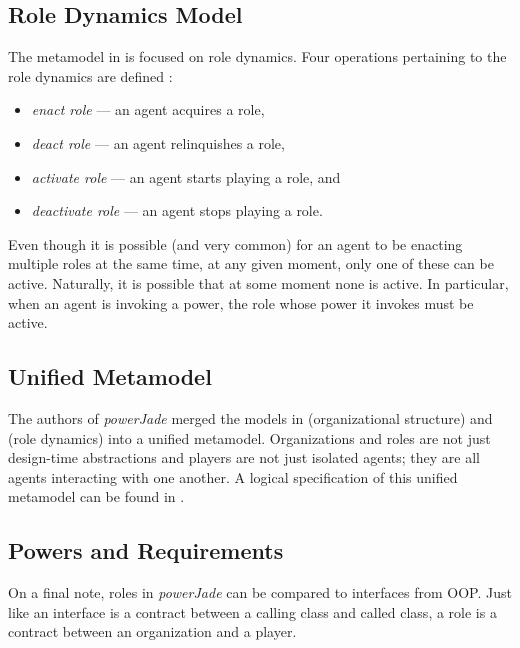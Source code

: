 \subsection*{Role Dynamics Model}

The metamodel in \cite{Dastani04} is focused on role dynamics.
Four operations pertaining to the role dynamics are defined \cite{Dastani04}:
\begin{itemize} %
	\item \textit{enact role} --- an agent acquires a role,
	\item \textit{deact role} --- an agent relinquishes a role,
	\item \textit{activate role} --- an agent starts playing a role, and
	\item \textit{deactivate role} --- an agent stops playing a role.
\end{itemize}

Even though it is possible (and very common) for an agent to be enacting multiple roles at the same time, at any given moment, only one of these can be active.
Naturally, it is possible that at some moment none is active.
In particular, when an agent is invoking a power, the role whose power it invokes must be active.

\subsection*{Unified Metamodel}

The authors of \textit{powerJade} merged the models in \cite{Boella04} (organizational structure) and \cite{Boella04} (role dynamics) into a unified metamodel.
Organizations and roles are not just design-time abstractions and players are not just isolated agents; they are all agents interacting with one another.
A logical specification of this unified metamodel can be found in \cite{Boella07}.

\subsection*{Powers and Requirements}

On a final note, roles in \textit{powerJade} can be compared to interfaces from OOP.
Just like an interface is a contract between a calling class and called class, a role is a contract between an organization and a player.

